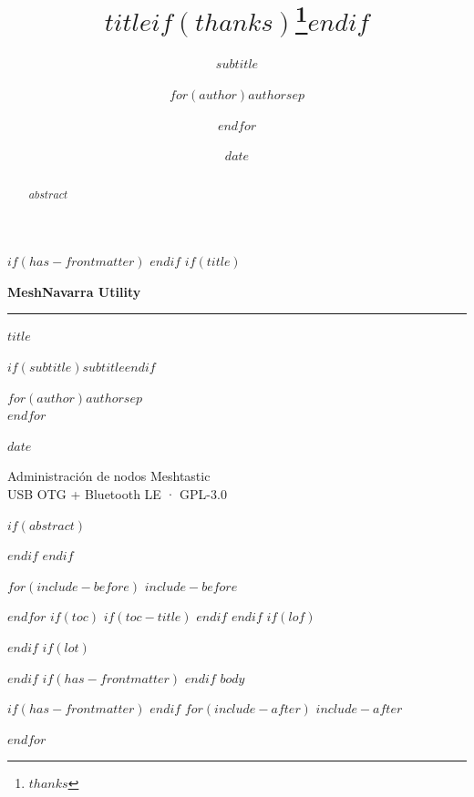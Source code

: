 \documentclass[
$for(babel-otherlangs)$
  $babel-otherlangs$,
$endfor$
$if(babel-lang)$
  $babel-lang$,
$endif$
$if(fontsize)$
  $fontsize$,
$endif$
$if(papersize)$
  $papersize$paper,
$endif$
$for(classoption)$
  $classoption$$sep$,
$endfor$
]{$documentclass$}
\title{$title$$if(thanks)$\thanks{$thanks$}$endif$}
\subtitle{$subtitle$}
\author{$for(author)$$author$$sep$ \and $endfor$}
\date{$date$}
\newcommand{\maketitlepage}{
  \begin{titlepage}
    \pagecolor{navBg}
    \centering
    \vspace*{2cm}
    {\Huge\bfseries\sffamily\color{navGold} MeshNavarra Utility \par}
    \vspace{0.3cm}
    {\color{navNeon}\rule{0.6\textwidth}{1.2pt}\par}
    \vspace{0.8cm}
    {\LARGE\sffamily\color{navText}$title$ \par}
    \vspace{1.5cm}
    {\large\itshape\color{navNeon}$if(subtitle)$$subtitle$$endif$ \par}
    \vspace{3cm}
    {\normalsize\sffamily\color{navGold}$for(author)$$author$$sep$ \\ $endfor$ \par}
    \vspace{0.5cm}
    {\normalsize\color{navText}$date$ \par}
    \vfill
    {\footnotesize\color{navNeon} Administración de nodos Meshtastic \\ USB OTG + Bluetooth LE · GPL-3.0 \par}
  \end{titlepage}
}
\begin{document}
$if(has-frontmatter)$
\frontmatter
$endif$
$if(title)$
\maketitlepage
$if(abstract)$
\begin{abstract}
$abstract$
\end{abstract}
$endif$
$endif$

$for(include-before)$
$include-before$

$endfor$
$if(toc)$
$if(toc-title)$
\renewcommand*\contentsname{$toc-title$}
$endif$
{
\setcounter{tocdepth}{$toc-depth$}
\tableofcontents
}
$endif$
$if(lof)$
\listoffigures
$endif$
$if(lot)$
\listoftables
$endif$
$if(has-frontmatter)$
\mainmatter
$endif$
$body$

$if(has-frontmatter)$
\backmatter
$endif$
$for(include-after)$
$include-after$

$endfor$
\end{document}
